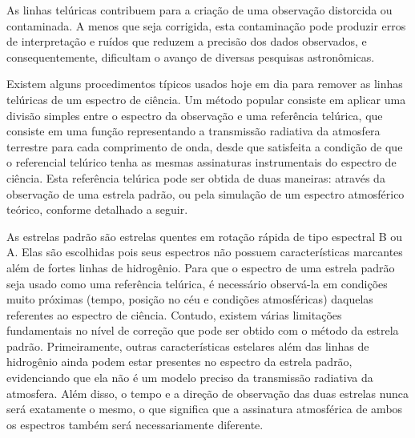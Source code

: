 

As linhas telúricas  contribuem para a criação de uma observação distorcida ou contaminada. A menos que seja corrigida, esta contaminação pode produzir erros de interpretação e ruídos que reduzem a precisão dos dados observados, e consequentemente, dificultam o avanço de diversas pesquisas astronômicas.

Existem alguns procedimentos típicos usados hoje em dia para remover as linhas telúricas de um espectro de ciência. Um método popular consiste em aplicar uma divisão simples entre o espectro da observação e uma referência telúrica, que consiste em uma função representando a transmissão radiativa da atmosfera terrestre para cada comprimento de onda, desde que satisfeita a condição de que o referencial telúrico tenha as mesmas assinaturas instrumentais do espectro de ciência. Esta referência telúrica pode ser obtida de duas maneiras: através da observação de uma estrela padrão, ou pela simulação de um espectro atmosférico teórico, conforme detalhado a seguir.

As estrelas padrão são estrelas quentes em rotação rápida de tipo espectral B ou A. Elas são escolhidas pois seus espectros não possuem características marcantes além de fortes linhas de hidrogênio. Para que o espectro de uma estrela padrão seja usado como uma referência telúrica, é necessário observá-la em condições muito próximas (tempo, posição no céu e condições atmosféricas) daquelas referentes ao espectro de ciência. Contudo, existem várias limitações fundamentais no nível de correção que pode ser obtido com o método da estrela padrão. Primeiramente, outras características estelares além das linhas de hidrogênio ainda podem estar presentes no espectro da estrela padrão, evidenciando que ela não é um modelo preciso da transmissão radiativa da atmosfera. Além disso, o tempo e a direção de observação das duas estrelas nunca será exatamente o mesmo, o que significa que a assinatura atmosférica de ambos os espectros também será necessariamente diferente.

